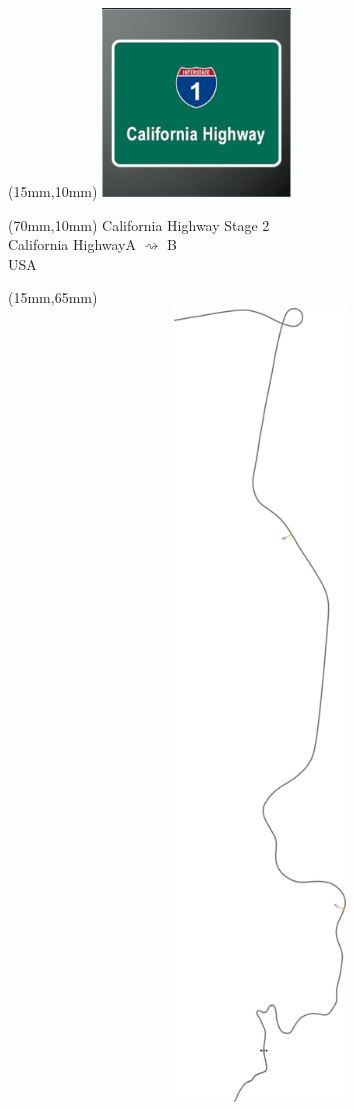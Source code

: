\null\newpage
\begin{textblock*}{50mm}(15mm,10mm)%
\includegraphics[width=50mm]{LG/2015-05-20_00077.png}
\end{textblock*}
\begin{textblock*}{130mm}(70mm,10mm)%
{\fontsize{20}{20}\selectfont California Highway Stage 2\\}
{\fontsize{16}{16}\selectfont California Highway\hfill A $\rightsquigarrow$ B\\}
{\fontsize{12}{12}\selectfont USA\\}
\end{textblock*}
\begin{textblock*}{185mm}(15mm,65mm)%
\centering
\mbox{\includegraphics[width=185mm,height=210mm,keepaspectratio]{PT/CAHIS2.pdf}}
\end{textblock*}
